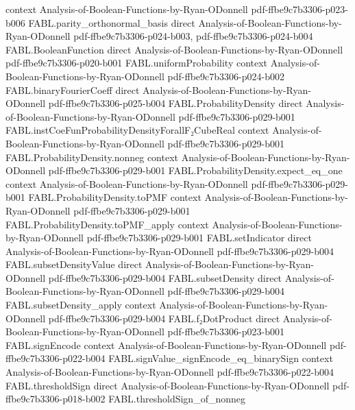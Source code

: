 \begin{theorem}
  {context}
  {Analysis-of-Boolean-Functions-by-Ryan-ODonnell}
  {pdf-ffbe9c7b3306-p023-b006}
\proofstep
  {FABL.parity_orthonormal_basis}
  {direct}
  {Analysis-of-Boolean-Functions-by-Ryan-ODonnell}
  {pdf-ffbe9c7b3306-p024-b003,
    pdf-ffbe9c7b3306-p024-b004}
\proofstep
  {FABL.BooleanFunction}
  {direct}
  {Analysis-of-Boolean-Functions-by-Ryan-ODonnell}
  {pdf-ffbe9c7b3306-p020-b001}
\proofstep
  {FABL.uniformProbability}
  {context}
  {Analysis-of-Boolean-Functions-by-Ryan-ODonnell}
  {pdf-ffbe9c7b3306-p024-b002}
\proofstep
  {FABL.binaryFourierCoeff}
  {direct}
  {Analysis-of-Boolean-Functions-by-Ryan-ODonnell}
  {pdf-ffbe9c7b3306-p025-b004}
\proofstep
  {FABL.ProbabilityDensity}
  {direct}
  {Analysis-of-Boolean-Functions-by-Ryan-ODonnell}
  {pdf-ffbe9c7b3306-p029-b001}
\proofstep
  {FABL.instCoeFunProbabilityDensityForallF₂CubeReal}
  {context}
  {Analysis-of-Boolean-Functions-by-Ryan-ODonnell}
  {pdf-ffbe9c7b3306-p029-b001}
\proofstep
  {FABL.ProbabilityDensity.nonneg}
  {context}
  {Analysis-of-Boolean-Functions-by-Ryan-ODonnell}
  {pdf-ffbe9c7b3306-p029-b001}
\proofstep
  {FABL.ProbabilityDensity.expect_eq_one}
  {context}
  {Analysis-of-Boolean-Functions-by-Ryan-ODonnell}
  {pdf-ffbe9c7b3306-p029-b001}
\proofstep
  {FABL.ProbabilityDensity.toPMF}
  {context}
  {Analysis-of-Boolean-Functions-by-Ryan-ODonnell}
  {pdf-ffbe9c7b3306-p029-b001}
\proofstep
  {FABL.ProbabilityDensity.toPMF_apply}
  {context}
  {Analysis-of-Boolean-Functions-by-Ryan-ODonnell}
  {pdf-ffbe9c7b3306-p029-b001}
\proofstep
  {FABL.setIndicator}
  {direct}
  {Analysis-of-Boolean-Functions-by-Ryan-ODonnell}
  {pdf-ffbe9c7b3306-p029-b004}
\proofstep
  {FABL.subsetDensityValue}
  {direct}
  {Analysis-of-Boolean-Functions-by-Ryan-ODonnell}
  {pdf-ffbe9c7b3306-p029-b004}
\proofstep
  {FABL.subsetDensity}
  {direct}
  {Analysis-of-Boolean-Functions-by-Ryan-ODonnell}
  {pdf-ffbe9c7b3306-p029-b004}
\proofstep
  {FABL.subsetDensity_apply}
  {context}
  {Analysis-of-Boolean-Functions-by-Ryan-ODonnell}
  {pdf-ffbe9c7b3306-p029-b004}
\proofstep
  {FABL.f₂DotProduct}
  {direct}
  {Analysis-of-Boolean-Functions-by-Ryan-ODonnell}
  {pdf-ffbe9c7b3306-p023-b001}
\proofstep
  {FABL.signEncode}
  {context}
  {Analysis-of-Boolean-Functions-by-Ryan-ODonnell}
  {pdf-ffbe9c7b3306-p022-b004}
\proofstep
  {FABL.signValue_signEncode_eq_binarySign}
  {context}
  {Analysis-of-Boolean-Functions-by-Ryan-ODonnell}
  {pdf-ffbe9c7b3306-p022-b004}
\proofstep
  {FABL.thresholdSign}
  {direct}
  {Analysis-of-Boolean-Functions-by-Ryan-ODonnell}
  {pdf-ffbe9c7b3306-p018-b002}
\proofstep
  {FABL.thresholdSign_of_nonneg}

\end{theorem}
